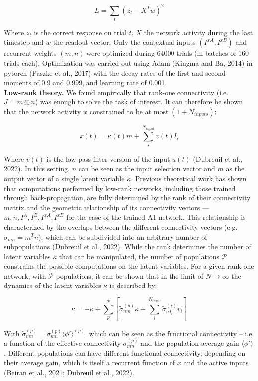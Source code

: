 \documentclass[12pt]{article}
\begin{document}
$$ L = \sum_t (z_t - X^Tw)^2 $$

Where $z_t$ is the correct response on trial $t$, $X$ the network activity during the last timestep and $ w$ the readout vector. Only the contextual inputs $ (I^{xA},I^{xB})$ and recurrent weights $ (m,n)$ were optimized during 64000 trials (in batches of 160 trials each). Optimization was carried out using Adam (Kingma and Ba, 2014) in pytorch (Paszke et al., 2017)  with the decay rates of the first and second moments of 0.9 and 0.999, and learning rate of 0.001. \\


\textbf{Low-rank theory.} We found empirically that rank-one connectivity (i.e. $J = m \otimes n $) was enough to solve the task of interest. It can therefore be shown that the network activity is constrained to be at most $(1 + N_{inputs})$:

$$ x(t) = \kappa{(t)} m+ \sum_i^{N_{input}} v{(t)} I_i$$

Where $ v(t) $ is the low-pass filter version of the input $ u(t) $ (Dubreuil et al., 2022). In this setting, $n$ can be seen as the input selection vector and $m$ as the output vector of a single latent variable $\kappa$.  Previous theoretical work has shown that computations performed by low-rank networks, including those trained through back-propagation, are fully determined by the rank of their connectivity matrix and the geometric relationship of its connectivity vectors — $ m, n, I^A, I^B, I^{xA}, I^{xB}$ for the case of the trained A1 network. This relationship is characterized by the overlaps between the different connectivity vectors (e.g. $\sigma_{mn} = m^Tn$), which can be subdivided into an arbitrary number of subpopulations (Dubreuil et al., 2022). While the rank determines the number of latent variables $\kappa$ that can be manipulated, the number of populations ${\mathcal{P}}$ constrains the possible computations on the latent variables. For a given rank-one network, with ${\mathcal{P}}$ populations, it can be shown that in the limit of $N \to \infty$ the dynamics of the latent variables $\kappa$ is described by:

$$\dot \kappa = -\kappa + \sum_p^{\mathcal{P}}  \left[ \tilde{\sigma}_{nm}^{(p)}\kappa + \sum_i^{N_{input}} \tilde{\sigma}_{nI_i} ^{(p)} v_i  \right]$$

With $\tilde{\sigma}^{(p)}_{mn} = \sigma^{(p)}_{mn} \langle\phi'\rangle ^{(p)}$, which can be seen as the functional connectivity – i.e. a function of the effective connectivity $\sigma_{mn}^{(p)}$ and the population average gain $\langle \phi' \rangle$. Different populations can have different functional connectivity, depending on their average gain, which is itself a recurrent function of $x$ and the active inputs (Beiran et al., 2021; Dubreuil et al., 2022). \\
\end{document}
